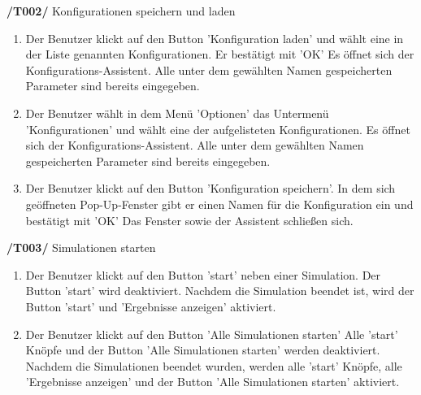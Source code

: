 \textbf{/T002/} Konfigurationen speichern und laden
\begin{enumerate}
\item {}
		{Der Benutzer klickt auf den Button 'Konfiguration laden' und wählt eine in der Liste genannten Konfigurationen. Er bestätigt mit 'OK'}
		{Es öffnet sich der Konfigurations-Assistent. Alle unter dem gewählten Namen gespeicherten Parameter sind bereits eingegeben.}
		
\item {}
		{Der Benutzer wählt in dem Menü 'Optionen' das Untermenü 'Konfigurationen' und wählt eine der aufgelisteten Konfigurationen.}
		{Es öffnet sich der Konfigurations-Assistent. Alle unter dem gewählten Namen gespeicherten Parameter sind bereits eingegeben.}

\item {}
		{Der Benutzer klickt auf den Button 'Konfiguration speichern'. In dem sich geöffneten Pop-Up-Fenster gibt er einen Namen für die Konfiguration ein und bestätigt mit 'OK'}
		{Das Fenster sowie der Assistent schließen sich.}
\end{enumerate}

\textbf{/T003/} Simulationen starten
\begin{enumerate}
\item {}
		{Der Benutzer klickt auf den Button 'start' neben einer Simulation.}
		{Der Button 'start' wird deaktiviert. Nachdem die Simulation beendet ist, wird der Button 'start' und 'Ergebnisse anzeigen' aktiviert.}
		
\item {}
		{Der Benutzer klickt auf den Button 'Alle Simulationen starten'}
		{Alle 'start' Knöpfe und der Button 'Alle Simulationen starten' werden deaktiviert. Nachdem die Simulationen beendet wurden, werden alle 'start' Knöpfe, alle 'Ergebnisse anzeigen' und der Button 'Alle Simulationen starten' aktiviert.}
\end{enumerate}

